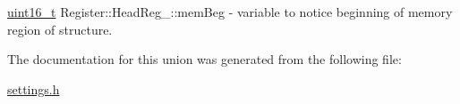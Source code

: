 \mbox{\label{unionRegister_1_1HeadReg___a0ec342c05f7dc7716557d9b2cef7dfd6}} 
{\footnotesize\ttfamily \mbox{\hyperlink{settings_8h_a017dd44e68049ffdd31500a8cd01ba68}{uint16\+\_\+t}} Register\+::\+Head\+Reg\+\_\+\+::\texorpdfstring{mem\+Beg}{memBeg}} - variable to notice beginning of memory region of structure.  



The documentation for this union was generated from the following file\+:\begin{DoxyCompactItemize}
\item 
\mbox{\hyperlink{settings_8h}{settings.\+h}}\end{DoxyCompactItemize}
\newpage